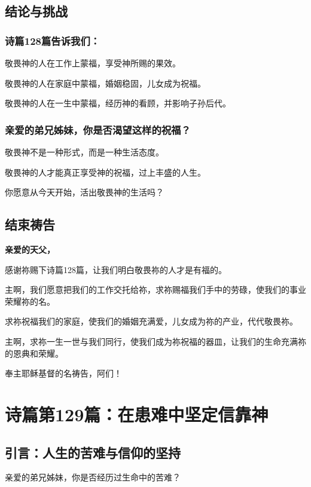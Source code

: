 \documentclass[a4paper, 12pt]{article}
\begin{document}
\subsection*{结论与挑战}
\subsubsection*{诗篇128篇告诉我们：}

\hspace{0.6cm}敬畏神的人在工作上蒙福，享受神所赐的果效。

敬畏神的人在家庭中蒙福，婚姻稳固，儿女成为祝福。

敬畏神的人在一生中蒙福，经历神的看顾，并影响子孙后代。

\subsubsection*{亲爱的弟兄姊妹，你是否渴望这样的祝福？}

\hspace{0.6cm}敬畏神不是一种形式，而是一种生活态度。

敬畏神的人才能真正享受神的祝福，过上丰盛的人生。

你愿意从今天开始，活出敬畏神的生活吗？

\subsection*{结束祷告}
\textbf{亲爱的天父，}

感谢祢赐下诗篇128篇，让我们明白敬畏祢的人才是有福的。

主啊，我们愿意把我们的工作交托给祢，求祢赐福我们手中的劳碌，使我们的事业荣耀祢的名。

求祢祝福我们的家庭，使我们的婚姻充满爱，儿女成为祢的产业，代代敬畏祢。

主啊，求祢一生一世与我们同行，使我们成为祢祝福的器皿，让我们的生命充满祢的恩典和荣耀。

奉主耶稣基督的名祷告，阿们！
\newpage
\section{诗篇第129篇：在患难中坚定信靠神}
\subsection*{引言：人生的苦难与信仰的坚持}
亲爱的弟兄姊妹，你是否经历过生命中的苦难？
\end{document}
